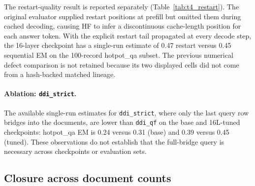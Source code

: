 \begin{table}[t]
\centering\small
\caption{T4 --- finetuned quality (EM) on Qwen2.5-7B-Instruct, 100 records
    per cell. $\Delta$ = full $-$ ddi\_qf. Each cell is a single-run estimate
    from one checkpoint lineage; no comparison confidence interval is
    available.}
\label{tab:t4}
\end{table}

The restart-quality result is reported separately
(Table~\ref{tab:t4_restart}). The original evaluator supplied restart
positions at prefill but omitted them during cached decoding, causing HF to
infer a discontinuous cache-length position for each answer token. With the
explicit restart tail propagated at every decode step, the 16-layer checkpoint
has a single-run estimate of 0.47 restart versus 0.45 sequential EM on the
100-record hotpot\_qa subset. The previous numerical defect comparison is not
retained because its two displayed cells did not come from a hash-backed
matched lineage.

\begin{table}[t]
\centering\small
\caption{T4 (restart) --- 16-layer checkpoint generation quality under
    sequential versus restart positions, 100 hotpot\_qa records per cell.
    Each cell is a single-run estimate without a comparison confidence
    interval; the legacy evaluator omitted decode positions during caching.}
\label{tab:t4_restart}
\end{table}

\paragraph{Ablation: \texttt{ddi\_strict}.}
The available single-run estimates for \texttt{ddi\_strict}, where only the
last query row bridges into the documents, are lower than \texttt{ddi\_qf} on
the base and 16L-tuned checkpoints: hotpot\_qa EM is 0.24 versus 0.31 (base)
and 0.39 versus 0.45 (tuned). These observations do not establish that the
full-bridge query is necessary across checkpoints or evaluation sets.

\subsection{Closure across document counts}
\label{sec:results-quality-docsweep}

